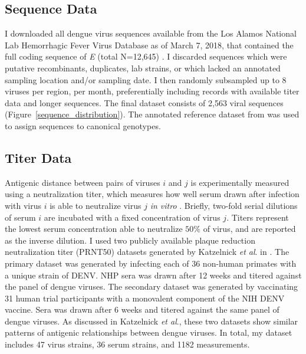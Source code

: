 \subsection*{Sequence Data}
I downloaded all dengue virus sequences available from the Los Alamos National Lab Hemorrhagic Fever Virus Database as of March 7, 2018, that contained the full coding sequence of \textit{E} (total N=12,645) \citep{kuiken2011lanl}.
I discarded sequences which were putative recombinants, duplicates, lab strains, or which lacked an annotated sampling location and/or sampling date.
I then randomly subsampled up to 8 viruses per region, per month, preferentially including records with available titer data and longer sequences.
The final dataset consists of 2,563 viral sequences (Figure~\ref{sequence_distribution}).
The annotated reference dataset from \citep{pyke2016highly} was used to assign sequences to canonical genotypes.

\subsection*{Titer Data}

Antigenic distance between pairs of viruses $i$ and $j$ is experimentally measured using a neutralization titer, which measures how well serum drawn after infection with virus $i$ is able to neutralize virus $j$ \textit{in vitro} \citep{russell1967dengue}.
Briefly, two-fold serial dilutions of serum $i$ are incubated with a fixed concentration of virus $j$.
Titers represent the lowest serum concentration able to neutralize $50\%$ of virus, and are reported as the inverse dilution.
I used two publicly available plaque reduction neutralization titer (PRNT50) datasets generated by Katzelnick \textit{et al}. in \citep{katzelnick2015dengue}.
The primary dataset was generated by infecting each of 36 non-human primates with a unique strain of DENV.
NHP sera was drawn after 12 weeks and titered against the panel of dengue viruses.
The secondary dataset was generated by vaccinating 31 human trial participants with a monovalent component of the NIH DENV vaccine.
Sera was drawn after 6 weeks and titered against the same panel of dengue viruses.
As discussed in Katzelnick \textit{et al}., these two datasets show similar patterns of antigenic relationships between dengue viruses.
In total, my dataset includes 47 virus strains, 36 serum strains, and 1182 measurements.

